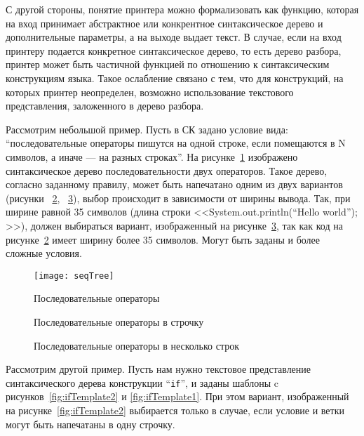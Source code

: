 С другой стороны, понятие принтера можно формализовать как функцию,
которая на вход принимает
абстрактное или конкрентное синтаксическое дерево и дополнительные параметры,
а на выходе выдает текст. В случае, если на вход принтеру подается конкретное
синтаксическое дерево, то есть дерево разбора, принтер может быть частичной
функцией по отношению к синтаксическим конструкциям языка.
Такое ослабление связано
с тем, что для конструкций, на которых принтер неопределен, возможно использование
текстового представления, заложенного в дерево разбора.

Рассмотрим небольшой пример.
Пусть в СК задано условие вида: “последовательные операторы пишутся
на одной строке,
если помещаются в N символов, а иначе --- на разных строках”.
На рисунке~\ref{fig:seqImage} изображено синтаксическое дерево
последовательности двух операторов. Такое дерево, согласно заданному
правилу, может быть напечатано одним из
двух вариантов (рисунки ~\ref{fig:seqCode1}, ~\ref{fig:seqCode2}),
выбор происходит в зависимости от ширины вывода. Так, при ширине равной
35 символов (длина строки <<System.out.println(“Hello world”); >>),
должен выбираться вариант, изображенный на рисунке~\ref{fig:seqCode2},
так как код на рисунке~\ref{fig:seqCode1} имеет ширину более 35 символов.
Могут быть заданы и более сложные условия.

\begin{figure}[h!]
	\centering
	\texttt{[image: seqTree]}
	\caption{Последовательные операторы}
	\label{fig:seqImage}
\end{figure}

\begin{figure}[h!]
	\centering
	
	\caption{Последовательные операторы в строчку}
	\label{fig:seqCode1}
\end{figure}

\begin{figure}[h!]
	\centering
	
	\caption{Последовательные операторы в несколько строк}
	\label{fig:seqCode2}
\end{figure}


Рассмотрим другой пример.
Пусть нам нужно текстовое представление синтаксического дерева конструкции
“\lstinline{if}”, и заданы шаблоны c рисунков~\ref{fig:ifTemplate2} и
\ref{fig:ifTemplate1}. При этом вариант, изображенный на
рисунке~\ref{fig:ifTemplate2} выбирается только в случае, если условие и
ветки могут быть напечатаны в одну строчку.

